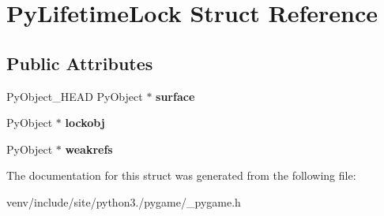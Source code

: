 \hypertarget{struct_py_lifetime_lock}{}\section{Py\+Lifetime\+Lock Struct Reference}
\label{struct_py_lifetime_lock}
\subsection*{Public Attributes}
\begin{DoxyCompactItemize}
\item 
\mbox{\label{struct_py_lifetime_lock_ae527cea45469df7dc60633c1221545b3}} 
Py\+Object\+\_\+\+H\+E\+AD Py\+Object $\ast$ {\bfseries surface}
\item 
\mbox{\label{struct_py_lifetime_lock_afb024f29b1c5768973d664c1f1112ec1}} 
Py\+Object $\ast$ {\bfseries lockobj}
\item 
\mbox{\label{struct_py_lifetime_lock_a6c181a90f38493bb73be39343eb1f9ad}} 
Py\+Object $\ast$ {\bfseries weakrefs}
\end{DoxyCompactItemize}


The documentation for this struct was generated from the following file\+:\begin{DoxyCompactItemize}
\item 
venv/include/site/python3./pygame/\+\_\+pygame.\+h\end{DoxyCompactItemize}
